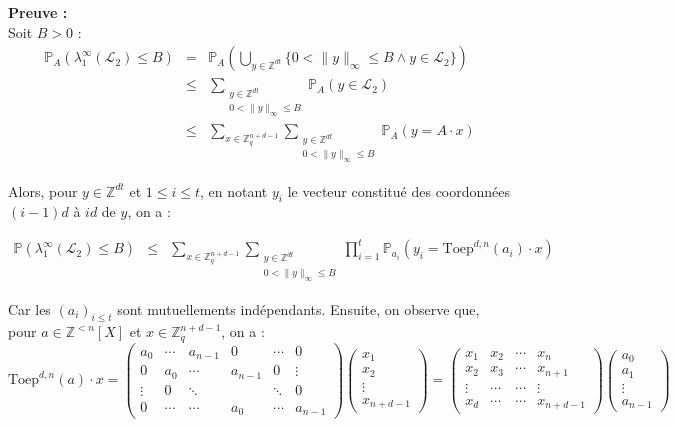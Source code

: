 \documentclass[11pt,a4paper]{article}
\begin{document}
\textbf{Preuve :} \\
Soit $B >0$ :
\begin{eqnarray*}
\mathbb{P}_A(\lambda_1^\infty(\mathcal{L}_2) \leq B) &=& \mathbb{P}_A( \bigcup_{y\in \mathbb{Z}^{dt}} \{0 < \|y\|_\infty \leq B \land y \in \mathcal{L}_2 \} ) \\
&\leq& \sum_{\substack{y \in \mathbb{Z}^{dt} \\ 0 < \|y\|_\infty \leq B}} \mathbb{P}_A(y \in \mathcal{L}_2) \\
&\leq&  \sum_{x \in \mathbb{Z}_q^{n+d-1}} \sum_{\substack{y \in \mathbb{Z}^{dt} \\ 0 < \|y\|_\infty \leq B}} \mathbb{P}_A(y=A\cdot x) 
\end{eqnarray*}

Alors, pour $y \in \mathbb{Z}^{dt}$ et $1 \leq i \leq t$, en notant $y_i$ le vecteur constitué des coordonnées $(i-1)d$ à $id$ de $y$, on a : 

\begin{eqnarray*}
\mathbb{P}(\lambda_1^\infty(\mathcal{L}_2) \leq B) &\leq& \sum_{x \in \mathbb{Z}_q^{n+d-1}} \sum_{\substack{y \in \mathbb{Z}^{dt} \\ 0 < \|y\|_\infty \leq B}} \prod_{i=1}^t \mathbb{P}_{a_i}(y_i =\text{Toep}^{d,n}(a_i) \cdot  x)
\end{eqnarray*}

Car les $(a_i)_{i\leq t}$ sont mutuellements indépendants. Ensuite, on observe que, pour $a \in \mathbb{Z}^{<n}[X]$ et $x \in \mathbb{Z}_q^{n+d-1}$, on a : 
$$ \text{Toep}^{d,n}(a) \cdot  x =  \begin{pmatrix}
a_0 & \cdots & a_{n-1} &0 & \cdots&  0 \\
0 & a_0 & \cdots & a_{n-1} & 0 &\vdots \\
\vdots & 0 & \ddots & & \ddots & 0  \\
0 & \cdots & \cdots & a_0 & \cdots & a_{n-1} 

\end{pmatrix} 
\begin{pmatrix}
x_{1} \\
x_{2} \\
\vdots \\
x_{n+d-1}
\end{pmatrix} 
=
\begin{pmatrix}
x_1 & x_2 & \cdots & x_n \\
x_2 & x_3 & \cdots & x_{n+1} \\
\vdots & \cdots & \cdots & \vdots \\
x_d & \cdots & \cdots & x_{n+d-1} 
\end{pmatrix}
\begin{pmatrix}
a_{0} \\
a_{1} \\
\vdots \\
a_{n-1}
\end{pmatrix}
$$
\end{document}
